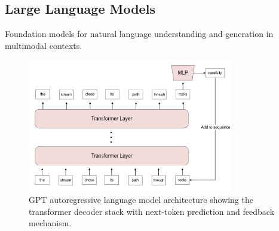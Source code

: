 \subsection{Large Language Models}

Foundation models for natural language understanding and generation in multimodal contexts.

\begin{figure}[htbp]
\centering
\includegraphics[width=0.8\textwidth]{Images/gpt.png}
\caption{GPT autoregressive language model architecture showing the transformer decoder stack with next-token prediction and feedback mechanism.}
\label{fig:gpt}
\end{figure}